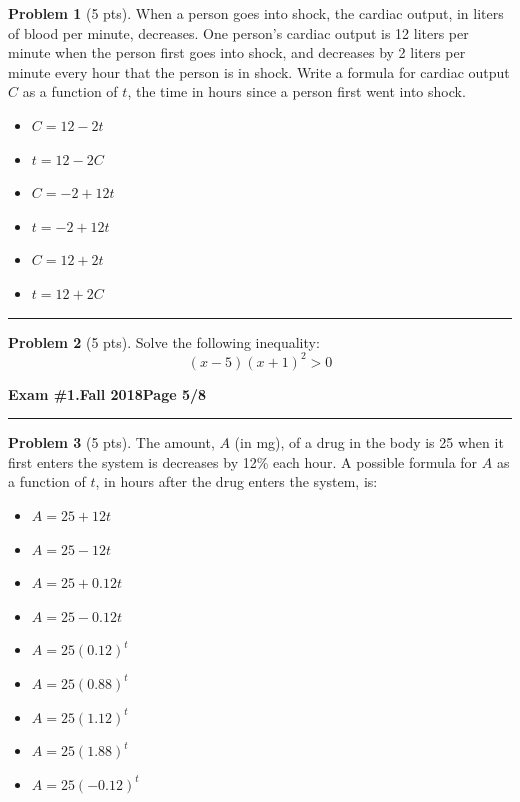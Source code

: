 \documentclass[12pt]{article}
\makeatletter
\theoremstyle{definition}
\newtheorem{problem}{Problem}
\newcommand*{\radiobutton}{%
  \@ifstar{\@radiobutton0}{\@radiobutton1}%
}
\newcommand*{\@radiobutton}[1]{%
  \begin{tikzpicture}
    \pgfmathsetlengthmacro\radius{height("X")/2}
    \draw[radius=\radius] circle;
    \ifcase#1 \fill[radius=.6*\radius] circle;\fi
  \end{tikzpicture}%
}
\makeatother
\begin{document}
\begin{problem}[5 pts]
  When a person goes into shock, the cardiac output, in liters of blood per minute, decreases. One person’s cardiac output
  is 12 liters per minute when the person first goes into shock, and decreases by 2 liters per minute every hour that the
  person is in shock. Write a formula for cardiac output $C$ as a function of $t$, the time in hours since a person first
  went into shock. 
  \begin{itemize}
  \item[\radiobutton] $C = 12 - 2t$
  \item[\radiobutton] $t = 12 - 2C$
  \item[\radiobutton] $C = -2 + 12t$
  \item[\radiobutton] $t = -2 + 12t$
  \item[\radiobutton] $C = 12 + 2t$
  \item[\radiobutton] $t = 12 + 2C$
  \end{itemize}
\end{problem}
\hrule

\begin{problem}[5 pts]
  Solve the following inequality:
  \begin{equation*} (x-5)(x+1)^2 > 0 \end{equation*}
\end{problem}

\newpage

\hfill{\large\bf Exam \#1.}\hfill{\large\bf  Fall 2018}\hfill{\large\bf Page 5/8}\hrule

\bigskip

\begin{problem}[5 pts]
  The amount, $A$ (in mg), of a drug in the body is 25 when it first enters the system is decreases by 12\% each hour. A
  possible formula for $A$ as a function of $t$, in hours after the drug enters the system, is: 
  \begin{itemize}
  \item[\radiobutton] $A=25+12t$
  \item[\radiobutton] $A=25-12t$
  \item[\radiobutton] $A=25+0.12t$
  \item[\radiobutton] $A=25-0.12t$
  \item[\radiobutton] $A=25(0.12)^t$
  \item[\radiobutton] $A=25(0.88)^t$
  \item[\radiobutton] $A=25(1.12)^t$
  \item[\radiobutton] $A=25(1.88)^t$
  \item[\radiobutton] $A=25(-0.12)^t$
  \end{itemize}
\end{problem}
\end{document}
